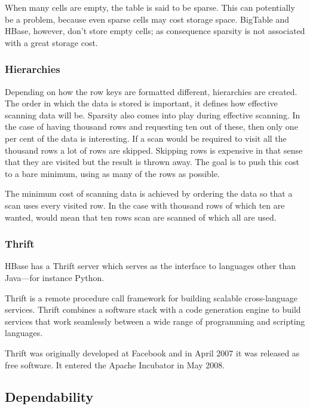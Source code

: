 When many cells are empty, the table is said to be sparse. This can potentially
be a problem, because even sparse cells may cost storage space.  BigTable and
HBase, however, don't store empty cells; as consequence sparsity is not
associated with a great storage cost.
\cite{olap_data_scalability,olap_solutions}


\subsubsection{Hierarchies}

Depending on how the row keys are formatted different, hierarchies are created.
The order in which the data is stored is important, it defines how effective
scanning data will be. Sparsity also comes into play during effective scanning.
In the case of having thousand rows and requesting ten out of these, then only
one per cent of the data is interesting. If a scan would be required to visit
all the thousand rows a lot of rows are skipped. Skipping rows is expensive in
that sense that they are visited but the result is thrown away. The goal is to
push this cost to a bare minimum, using as many of the rows as possible.

The minimum cost of scanning data is achieved by ordering the data so that
a scan uses every visited row. In the case with thousand rows of which ten
are wanted, would mean that ten rows scan are scanned of which all are
used.


\subsubsection{Thrift}

HBase has a Thrift server which serves as the interface to languages other than
Java---for instance Python.

Thrift is a remote procedure call framework for building scalable cross-language
services. Thrift combines a software stack with a code generation engine to
build services that work seamlessly between a wide range of programming and
scripting languages. \cite{thrift}

Thrift was originally developed at Facebook and in April 2007 it was released as
free software. It entered the Apache Incubator in May 2008.


\subsection{Dependability}

